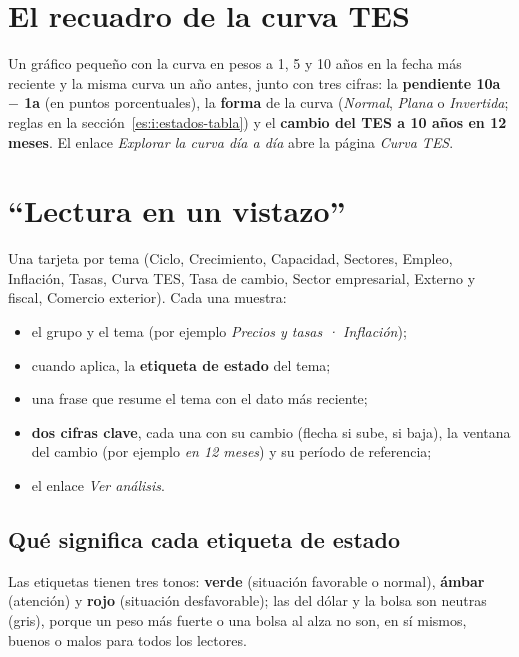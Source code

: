 \section{El recuadro de la curva TES}
Un gráfico pequeño con la curva en pesos a 1, 5 y 10 años en la fecha más reciente y la misma curva un año antes,
junto con tres cifras: la \textbf{pendiente 10a $-$ 1a} (en puntos porcentuales), la \textbf{forma} de la curva
(\emph{Normal}, \emph{Plana} o \emph{Invertida}; reglas en la sección~\ref{es:i:estados-tabla}) y el
\textbf{cambio del TES a 10 años en 12 meses}. El enlace \emph{Explorar la curva día a día} abre la página
\emph{Curva TES}.

\section{``Lectura en un vistazo''}
Una tarjeta por tema (Ciclo, Crecimiento, Capacidad, Sectores, Empleo, Inflación, Tasas, Curva TES, Tasa de
cambio, Sector empresarial, Externo y fiscal, Comercio exterior). Cada una muestra:
\begin{itemize}
\item el grupo y el tema (por ejemplo \emph{Precios y tasas · Inflación});
\item cuando aplica, la \textbf{etiqueta de estado} del tema;
\item una frase que resume el tema con el dato más reciente;
\item \textbf{dos cifras clave}, cada una con su cambio (flecha  si sube,  si baja), la ventana
  del cambio (por ejemplo \emph{en 12 meses}) y su período de referencia;
\item el enlace \emph{Ver análisis}.
\end{itemize}

\subsection{Qué significa cada etiqueta de estado}
\label{es:u:pildoras}
Las etiquetas tienen tres tonos: \textcolor{cmgreen}{\textbf{verde}} (situación favorable o normal),
\textcolor{cmamber}{\textbf{ámbar}} (atención) y \textcolor{cmred}{\textbf{rojo}} (situación desfavorable);
las del dólar y la bolsa son neutras (gris), porque un peso más fuerte o una bolsa al alza no son, en sí mismos,
buenos o malos para todos los lectores.

